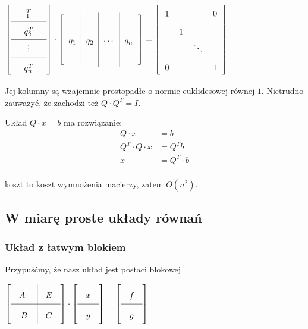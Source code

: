 \documentclass[hidelinks,a4paper,fleqn]{article}
\newcommand{\eye}{I}
\begin{document}
$\arraycolsep=0.6em\def\arraystretch{1.8}
\left[
	\begin{array}{c}
		\quad _1^T \quad   \\ \hline
		\quad q_2^T \quad  \\ \hline
		\quad \vdots \quad \\ \hline
		\quad q_n^T \quad  
	\end{array}
\right]
\cdot
\left[
	\begin{array}{c|c|c|c}
		    &     &        &     \\
		q_1 & q_2 & \cdots & q_n \\
		    &     &        &     
	\end{array}
\right]
=
\left[
	\begin{array}{cccc}
		1 &   &        & 0 \\
		  & 1 &        &   \\
		  &   & \ddots &   \\
		0 &   &        & 1 
	\end{array}
\right]	
$

Jej kolumny są wzajemnie prostopadłe o normie euklidesowej równej $1$. Nietrudno zauważyć, że zachodzi też $Q \cdot Q^T = \eye$.

Układ $Q \cdot x = b$ ma rozwiązanie:
\begin{equation}
	\begin{aligned}
		Q \cdot x           & = b           \\
		Q^T \cdot Q \cdot x & = Q^T b       \\
		x                   & = Q^T \cdot b \\
	\end{aligned}
\end{equation}

koszt to koszt wymnożenia macierzy, zatem  $O(n^2)$.


\subsection{W miarę proste układy równań}

\subsubsection{Układ z łatwym blokiem}

Przypuśćmy, że nasz układ jest postaci blokowej

$\arraycolsep=1em\def\arraystretch{2}
\left[
	\begin{array}{c|c}
		A_1 & E \\ \hline
		B   & C 
	\end{array}
\right] \cdot
\left[
	\begin{array}{c}
		x \\ \hline
		y 
	\end{array}
\right] = 
\left[
	\begin{array}{c}
		f \\ \hline
		g 
	\end{array}
\right]
$
\end{document}
